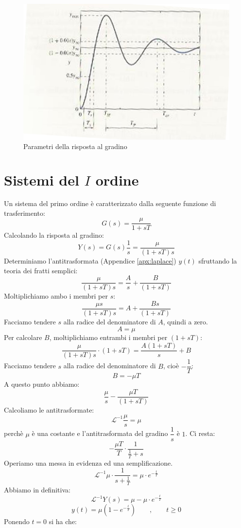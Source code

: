 \documentclass[a4paper]{report}
\begin{document}
\begin{figure}[!h]
  \begin{center}
    \includegraphics[scale=0.5]{./figures/parms.png}
    \caption{Parametri della risposta al gradino}\label{fig:caratparms}
  \end{center}
\end{figure} 

\section {Sistemi del $I$ ordine}
Un sistema del primo ordine \`e caratterizzato dalla seguente funzione
di trasferimento:
\begin{equation}\label{eq:firstordfdt}
  G(s) = \dfrac{\mu}{1+sT}
\end{equation}
Calcolando la risposta al gradino:
\begin{displaymath}
  Y(s) = G(s)\dfrac{1}{s} = \dfrac{\mu}{(1+sT)s}
\end{displaymath}
Determiniamo l'antitrasformata (Appendice \ref{apx:laplace}) $y(t)$
sfruttando la teoria dei fratti semplici:
\[
  \dfrac{\mu}{(1 + sT)s} = \dfrac{A}{s} + \dfrac{B}{(1 + sT)}
\]
Moltiplichiamo ambo i membri per $s$:
\[
  \dfrac{\mu s}{(1 + sT)s} = A + \dfrac{Bs}{(1 + sT)}
\]
Facciamo tendere $s$ alla radice del denominatore di $A$, quindi a
zero.
\[
  A = \mu
\]
Per calcolare $B$, moltiplichiamo entrambi i membri per $(1 + sT)$:
\[
  \dfrac{\mu}{(1 + sT)s} \cdot (1 + sT) = \dfrac{A(1 + sT)}{s} + B
\]
Facciamo tendere $s$ alla radice del denominatore di $B$, cio\`e
$-\dfrac{1}{T}$:
\[
  B = - \mu T
\]
A questo punto abbiamo:
\[
  \dfrac{\mu}{s} - \dfrac{\mu T}{(1 + sT)}
\]
Calcoliamo le antitrasformate:
\[
  \mathscr{L}^{-1} \dfrac{\mu}{s} = \mu
\]
perch\`e $\mu$ \`e una costante e l'antitrasformata del gradino $\dfrac{1}{s}$
\`e $1$.
Ci resta:
\[
  - \dfrac{\mu T}{T} \cdot \dfrac{1}{\frac{1}{T} + s}
\]
Operiamo una messa in evidenza ed una semplificazione.
\[
  \mathscr{L}^{-1} \mu \cdot \dfrac{1}{s + \frac{1}{T}} = \mu \cdot
  e^{- \frac{t}{T}}
\]
Abbiamo in definitiva:
\[
  \mathscr{L}^{-1} Y(s) = \mu - \mu \cdot e^{- \frac{t}{T}}
\]
\begin{equation}\label{eq:rispgradfirst}
  y(t) = \mu(1-e^{-\frac{t}{T}}) \qquad, \qquad t\ge0
\end{equation}
Ponendo $t = 0$ si ha che:
\end{document}
